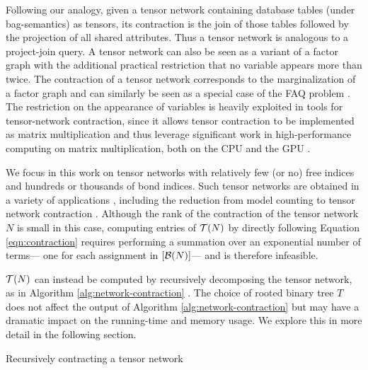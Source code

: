 Following our analogy, given a tensor network containing database tables (under bag-semantics) as tensors, its contraction is the join of those tables followed by the projection of all shared attributes. Thus a tensor network is analogous to a project-join query. A tensor network can also be seen as a variant of a factor graph \cite{KFL01} with the additional practical restriction that no variable appears more than twice. The contraction of a tensor network corresponds to the marginalization of a factor graph \cite{RS17} and can similarly be seen as a special case of the FAQ problem \cite{KNR16}. The restriction on the appearance of variables is heavily exploited in tools for tensor-network contraction, since it allows tensor contraction to be implemented as matrix multiplication and thus leverage significant work in high-performance computing on matrix multiplication, both on the CPU \cite{LHKK77} and the GPU \cite{FSH04}.

We focus in this work on tensor networks with relatively few (or no) free indices and hundreds or thousands of bond indices. Such tensor networks are obtained in a variety of applications \cite{Cichocki14,DLVR18}, including the reduction from model counting to tensor network contraction \cite{BMT15}. Although the rank of the contraction of the tensor network $N$ is small in this case, computing entries of $\mathcal{T}(N)$ by
directly following Equation \ref{eqn:contraction} requires performing a summation over an exponential number of terms--- one for each assignment in $[\mathcal{B}(N)]$--- and is therefore infeasible.

$\mathcal{T}(N)$ can instead be computed by recursively decomposing the tensor network, as in Algorithm \ref{alg:network-contraction} \cite{EP14}. The choice of rooted binary tree $T$ does not affect the output of Algorithm \ref{alg:network-contraction} but may have a dramatic impact on the running-time and memory usage. We explore this in more detail in the following section.

\begin{algorithm*}[t]
    \label{alg:network-contraction}
    \caption{Recursively contracting a tensor network}
    
    \DontPrintSemicolon
\end{algorithm*}

